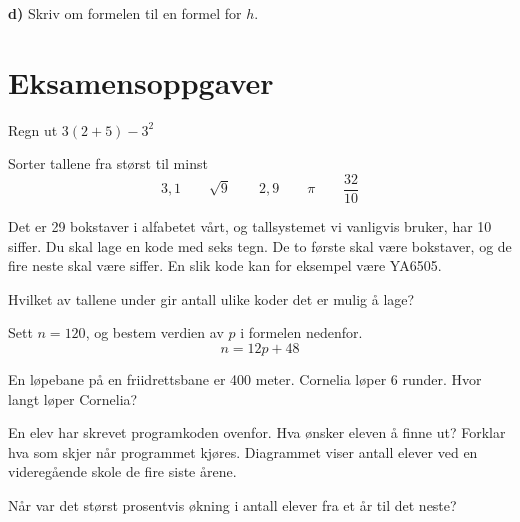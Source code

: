 \textbf{d)} Skriv om formelen til en formel for $ h $.



\newpage
\section{Eksamensoppgaver}
\st{
\eksbm
}

Regn ut $ 3(2+5)-3^2  $

Sorter tallene fra størst til minst
\[ 3,1\qquad\sqrt{9}\qquad2,9\qquad\pi \qquad \frac{32}{10} \]

Det er 29 bokstaver i alfabetet vårt, og tallsystemet vi vanligvis bruker, har 10 siffer.
Du skal lage en kode med seks tegn. De to første skal være bokstaver, og de fire neste skal være
siffer. En slik kode kan for eksempel være YA6505. \os

Hvilket av tallene under gir antall ulike koder det er mulig å lage? \os
{}

Sett $ n=120 $, og bestem verdien av $ p $ i formelen nedenfor. 
\[ n = 12p + 48 \]

En løpebane på en friidrettsbane er 400 meter.
Cornelia løper 6 runder. Hvor langt løper Cornelia? \os


En elev har skrevet programkoden ovenfor.
Hva ønsker eleven å finne ut?
Forklar hva som skjer når programmet kjøres.
\newpage
{}
Diagrammet viser antall elever ved en videregående skole de fire siste årene.\os

Når var det størst prosentvis økning i antall elever fra et år til det neste?
	





